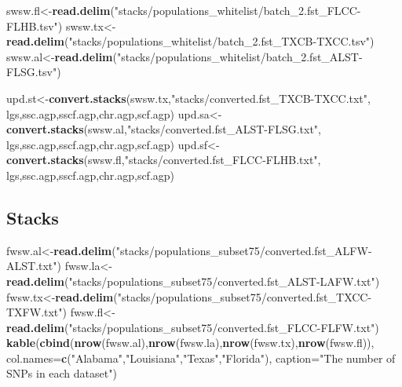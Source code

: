 \documentclass[11pt,]{article}
\newenvironment{Shaded}{\begin{snugshade}}{\end{snugshade}}
\newcommand{\KeywordTok}[1]{\textcolor[rgb]{0.13,0.29,0.53}{\textbf{#1}}}
\newcommand{\DataTypeTok}[1]{\textcolor[rgb]{0.13,0.29,0.53}{#1}}
\newcommand{\StringTok}[1]{\textcolor[rgb]{0.31,0.60,0.02}{#1}}
\newcommand{\NormalTok}[1]{#1}
\begin{document}
\begin{Shaded}
\begin{Highlighting}[]
\NormalTok{swsw.fl<-}\KeywordTok{read.delim}\NormalTok{(}\StringTok{"stacks/populations_whitelist/batch_2.fst_FLCC-FLHB.tsv"}\NormalTok{)}
\NormalTok{swsw.tx<-}\KeywordTok{read.delim}\NormalTok{(}\StringTok{"stacks/populations_whitelist/batch_2.fst_TXCB-TXCC.tsv"}\NormalTok{)}
\NormalTok{swsw.al<-}\KeywordTok{read.delim}\NormalTok{(}\StringTok{"stacks/populations_whitelist/batch_2.fst_ALST-FLSG.tsv"}\NormalTok{)}

\NormalTok{upd.st<-}\KeywordTok{convert.stacks}\NormalTok{(swsw.tx,}\StringTok{"stacks/converted.fst_TXCB-TXCC.txt"}\NormalTok{,}
\NormalTok{                       lgs,ssc.agp,sscf.agp,chr.agp,scf.agp)}
\NormalTok{upd.sa<-}\KeywordTok{convert.stacks}\NormalTok{(swsw.al,}\StringTok{"stacks/converted.fst_ALST-FLSG.txt"}\NormalTok{,}
\NormalTok{                       lgs,ssc.agp,sscf.agp,chr.agp,scf.agp)}
\NormalTok{upd.sf<-}\KeywordTok{convert.stacks}\NormalTok{(swsw.fl,}\StringTok{"stacks/converted.fst_FLCC-FLHB.txt"}\NormalTok{,}
\NormalTok{                       lgs,ssc.agp,sscf.agp,chr.agp,scf.agp)}
\end{Highlighting}
\end{Shaded}

\subsection*{Stacks}\label{stacks}

\begin{Shaded}
\begin{Highlighting}[]
\NormalTok{fwsw.al<-}\KeywordTok{read.delim}\NormalTok{(}\StringTok{"stacks/populations_subset75/converted.fst_ALFW-ALST.txt"}\NormalTok{)}
\NormalTok{fwsw.la<-}\KeywordTok{read.delim}\NormalTok{(}\StringTok{"stacks/populations_subset75/converted.fst_ALST-LAFW.txt"}\NormalTok{)}
\NormalTok{fwsw.tx<-}\KeywordTok{read.delim}\NormalTok{(}\StringTok{"stacks/populations_subset75/converted.fst_TXCC-TXFW.txt"}\NormalTok{)}
\NormalTok{fwsw.fl<-}\KeywordTok{read.delim}\NormalTok{(}\StringTok{"stacks/populations_subset75/converted.fst_FLCC-FLFW.txt"}\NormalTok{)}
\KeywordTok{kable}\NormalTok{(}\KeywordTok{cbind}\NormalTok{(}\KeywordTok{nrow}\NormalTok{(fwsw.al),}\KeywordTok{nrow}\NormalTok{(fwsw.la),}\KeywordTok{nrow}\NormalTok{(fwsw.tx),}\KeywordTok{nrow}\NormalTok{(fwsw.fl)),}
      \DataTypeTok{col.names=}\KeywordTok{c}\NormalTok{(}\StringTok{"Alabama"}\NormalTok{,}\StringTok{"Louisiana"}\NormalTok{,}\StringTok{"Texas"}\NormalTok{,}\StringTok{"Florida"}\NormalTok{),}
      \DataTypeTok{caption=}\StringTok{"The number of SNPs in each dataset"}\NormalTok{)}
\end{Highlighting}
\end{Shaded}
\end{document}
